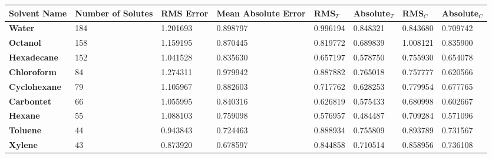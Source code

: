 \documentclass{amsart}
\begin{document}
 
\begin{center}
\begin{tabular}{|l|l|l|l|l|l|l|l|} 
\hline  
\textbf{Solvent Name}&\textbf{Number of Solutes}&\textbf{RMS Error}&\textbf{Mean Absolute Error}&\textbf{RMS$_{T}$}&\textbf{Absolute$_{T}$}&\textbf{RMS$_{C}$}&\textbf{Absolute$_{C}$} \\ \hline
\hline 
\textbf{Water}&184&1.201693&0.898797&0.996194&0.848321&0.843680&0.709742 \\ \hline 
\textbf{Octanol}&158&1.159195&0.870445&0.819772&0.689839&1.008121&0.835900 \\ \hline 
\textbf{Hexadecane}&152&1.041528&0.835630&0.657197&0.578750&0.755930&0.654078 \\ \hline 
\textbf{Chloroform}& 84&1.274311&0.979942&0.887882&0.765018&0.757777&0.620566 \\ \hline 
\textbf{Cyclohexane}& 79&1.105967&0.882603&0.717762&0.628253&0.779954&0.677765 \\ \hline 
\textbf{Carbontet}& 66&1.055995&0.840316&0.626819&0.575433&0.680998&0.602667 \\ \hline 
\textbf{Hexane}& 55&1.088103&0.759098&0.576957&0.484487&0.709284&0.571096 \\ \hline 
\textbf{Toluene}& 44&0.943843&0.724463&0.888934&0.755809&0.893789&0.731567 \\ \hline 
\textbf{Xylene}& 43&0.873920&0.678597&0.844858&0.710514&0.858956&0.736108 \\ \hline 
\end{tabular} 
\end{center} 
\end{document}
